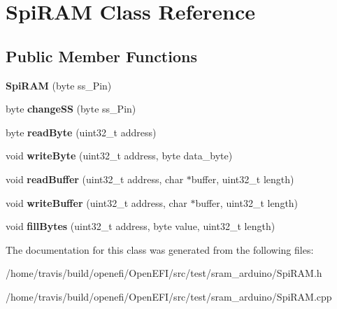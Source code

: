 \hypertarget{classSpiRAM}{}\section{Spi\+R\+AM Class Reference}
\label{classSpiRAM}
\subsection*{Public Member Functions}
\begin{DoxyCompactItemize}
\item 
{\bfseries Spi\+R\+AM} (byte ss\+\_\+\+Pin)\hypertarget{classSpiRAM_a43ad04217dcbeb1d4fbdca0b4b42893b}{}\label{classSpiRAM_a43ad04217dcbeb1d4fbdca0b4b42893b}

\item 
byte {\bfseries change\+SS} (byte ss\+\_\+\+Pin)\hypertarget{classSpiRAM_a2ed8e3f5609a11e06c1e20fac142dc50}{}\label{classSpiRAM_a2ed8e3f5609a11e06c1e20fac142dc50}

\item 
byte {\bfseries read\+Byte} (uint32\+\_\+t address)\hypertarget{classSpiRAM_a38d7ea7c119802bbbc262c8f3fda8874}{}\label{classSpiRAM_a38d7ea7c119802bbbc262c8f3fda8874}

\item 
void {\bfseries write\+Byte} (uint32\+\_\+t address, byte data\+\_\+byte)\hypertarget{classSpiRAM_a1655f164c2f0d97339cf7681da982f84}{}\label{classSpiRAM_a1655f164c2f0d97339cf7681da982f84}

\item 
void {\bfseries read\+Buffer} (uint32\+\_\+t address, char $\ast$buffer, uint32\+\_\+t length)\hypertarget{classSpiRAM_af32286caa4979214895357042089eb55}{}\label{classSpiRAM_af32286caa4979214895357042089eb55}

\item 
void {\bfseries write\+Buffer} (uint32\+\_\+t address, char $\ast$buffer, uint32\+\_\+t length)\hypertarget{classSpiRAM_a22b9d759991b732ac1de5908482c7c99}{}\label{classSpiRAM_a22b9d759991b732ac1de5908482c7c99}

\item 
void {\bfseries fill\+Bytes} (uint32\+\_\+t address, byte value, uint32\+\_\+t length)\hypertarget{classSpiRAM_af34fe208f2f04f8328ad1fb39c884e05}{}\label{classSpiRAM_af34fe208f2f04f8328ad1fb39c884e05}

\end{DoxyCompactItemize}


The documentation for this class was generated from the following files\+:\begin{DoxyCompactItemize}
\item 
/home/travis/build/openefi/\+Open\+E\+F\+I/src/test/sram\+\_\+arduino/Spi\+R\+A\+M.\+h\item 
/home/travis/build/openefi/\+Open\+E\+F\+I/src/test/sram\+\_\+arduino/Spi\+R\+A\+M.\+cpp\end{DoxyCompactItemize}
